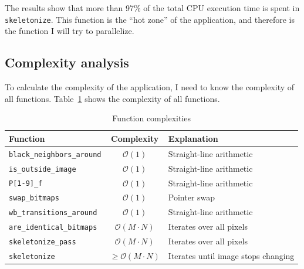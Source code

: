 \documentclass[11pt,a4paper]{article}
\begin{document}
            The results show that more than 97\% of the total CPU execution time is spent in \verb+skeletonize+.
            This function is the ``hot zone'' of the application, and therefore is the function I will try to parallelize.

        \subsection{Complexity analysis}
            To calculate the complexity of the application, I need to know the complexity of all functions.
            Table~\ref{tab:function_complexities} shows the complexity of all functions.

            \begin{table}[h]
            \centering
                \begin{tabular}{lcl}
                    \toprule
                    Function                      & Complexity                    & Explanation                         \\
                    \midrule
                    \verb+black_neighbors_around+ & $\mathcal{O}(1)$              & Straight-line arithmetic            \\
                    \verb+is_outside_image+       & $\mathcal{O}(1)$              & Straight-line arithmetic            \\
                    \verb+P[1-9]_f+               & $\mathcal{O}(1)$              & Straight-line arithmetic            \\
                    \verb+swap_bitmaps+           & $\mathcal{O}(1)$              & Pointer swap                        \\
                    \verb+wb_transitions_around+  & $\mathcal{O}(1)$              & Straight-line arithmetic            \\
                    \verb+are_identical_bitmaps+  & $\mathcal{O}(M \cdot N)$      & Iterates over all pixels            \\
                    \verb+skeletonize_pass+       & $\mathcal{O}(M \cdot N)$      & Iterates over all pixels            \\
                    \verb+skeletonize+            & $\geq \mathcal{O}(M \cdot N)$ & Iterates until image stops changing \\
                    \bottomrule
                \end{tabular}
                \caption{Function complexities}
                \label{tab:function_complexities}
            \end{table}
\end{document}
